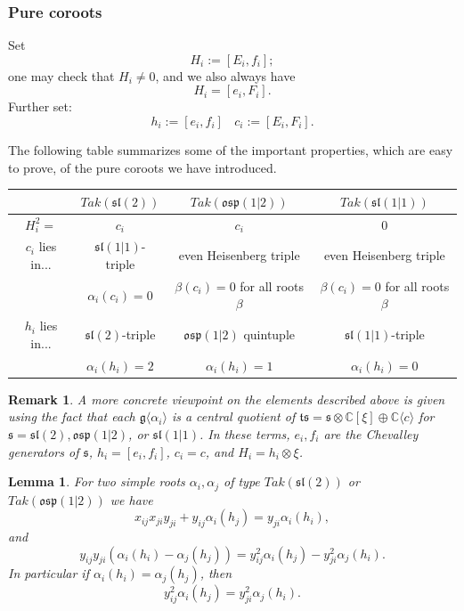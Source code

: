 \documentclass[10pt,a4paper]{amsart}
\newtheorem{remark}{Remark}
\newtheorem{lemma}{Lemma}
\def\C{\mathbb{C}}
\def\g{\mathfrak{g}}
\def\l{\mathfrak{l}}
\def\o{\mathfrak{o}}
\def\p{\mathfrak{p}}
\def\s{\mathfrak{s}}
\begin{document}
	\subsubsection{Pure coroots} Set 
	\[
	H_i:=[E_i,f_i];
	\]
	one may check that $H_i\neq0$, and we also always have 
	\[
	H_i=[e_i,F_i].
	\]
	Further set:
	\[
	h_i:=[e_i,f_i] \ \ \ \ c_i:=[E_i,F_i].
	\]
	
	The following table summarizes some of the important properties, which are easy to prove, of the pure coroots we have introduced.
	\begin{center}
		\begin{tabular}{|c|c|c|c|}
			\hline
			& $Tak(\s\l(2))$ & $Tak(\o\s\p(1|2))$ & $Tak(\s\l(1|1))$\\
			\hline
			$H_i^2=$ & $c_i$ & $c_i$ & 0\\
			\hline 
			$c_i$ lies in... & $\s\l(1|1)$-triple & even Heisenberg triple & even Heisenberg triple\\
			& $\alpha_i(c_i)=0$ & $\beta(c_i)=0$ for all roots $\beta$ & $\beta(c_i)=0$ for all roots $\beta$\\
			\hline
			$h_i$ lies in... & $\s\l(2)$-triple & $\o\s\p(1|2)$ quintuple & $\s\l(1|1)$-triple\\
			& $\alpha_i(h_i)=2$ & $\alpha_i(h_i)=1$ & $\alpha_i(h_i)=0$\\
			\hline
		\end{tabular}	
	\end{center}
	
	\begin{remark}\label{remark_root_subalg_really_takiff}
		A more concrete viewpoint on the elements described above is given using the fact that each $\g\langle\alpha_i\rangle$ is a central quotient of $\mathfrak{t}\s=\s\otimes\C[\xi]\oplus\C\langle c\rangle$ for $\s=\s\l(2),\o\s\p(1|2)$, or $\s\l(1|1)$.  In these terms, $e_i,f_i$ are the Chevalley generators of $\s$, $h_i=[e_i,f_i]$, $c_i=c$, and $H_i=h_i\otimes \xi$.  
	\end{remark}

	\begin{lemma}\label{lemma_nontrivial_relation_on_ys}
		For two simple roots $\alpha_i,\alpha_j$ of type $Tak(\s\l(2))$ or $Tak(\o\s\p(1|2))$ we have
		\[
		x_{ij}x_{ji}y_{ji}+y_{ij}\alpha_i(h_j)=y_{ji}\alpha_i(h_i),
		\]
		and
		\[
		y_{ij}y_{ji}(\alpha_i(h_i)-\alpha_j(h_j))=y_{ij}^2\alpha_i(h_j)-y_{ji}^2\alpha_j(h_i).
		\]
		In particular if $\alpha_i(h_i)=\alpha_j(h_j)$, then
		\[
		y_{ij}^2\alpha_i(h_j)=y_{ji}^2\alpha_j(h_i).
		\]
	\end{lemma}
\end{document}
